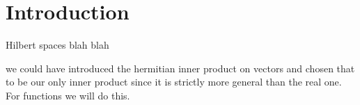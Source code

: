 \section{Introduction}
Hilbert spaces blah blah

we could have introduced the hermitian inner product on vectors and chosen that to be our only inner product since it is strictly more general than the real one. For functions we will do this. 